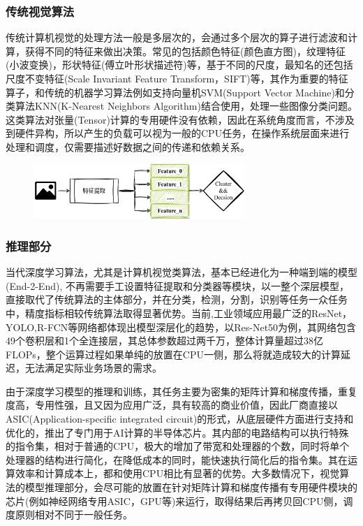 \documentclass[master]{shtthesis}
\begin{document}
\subsubsection{传统视觉算法}\label{传统视觉算法}
传统计算机视觉的处理方法一般是多层次的，会通过多个层次的算子进行滤波和计算，获得不同的特征来做出决策。常见的包括颜色特征(颜色直方图)，纹理特征(小波变换)，形状特征(傅立叶形状描述符)等，基于不同的尺度，最知名的还包括尺度不变特征(Scale Invariant Feature Transform，SIFT\cite{ng2003sift})等，其作为重要的特征算子，和传统的机器学习算法例如支持向量机SVM(Support Vector Machine)和分类算法KNN(K-Nearest Neighbors Algorithm)结合使用，处理一些图像分类问题。这类算法对张量(Tensor)计算的专用硬件没有依赖，因此在系统角度而言，不涉及到硬件异构，所以产生的负载可以视为一般的CPU任务，在操作系统层面来进行处理和调度，仅需要描述好数据之间的传递和依赖关系。

\begin{figure}[htbp]
	\centering
	\includegraphics[width=8cm]{img/trad_vis.png}
	\label{基于传统视觉算法的计算流程}
\end{figure}

\subsubsection{推理部分}\label{推理部分}
当代深度学习算法，尤其是计算机视觉类算法，基本已经进化为一种端到端的模型(End-2-End), 不再需要手工设置特征提取和分类器等模块，以一整个深层模型，直接取代了传统算法的主体部分，并在分类，检测，分割，识别等任务一众任务中，精度指标相较传统算法取得显著优势。当前,工业领域应用最广泛的ResNet，YOLO,R-FCN等网络都体现出模型深层化的趋势，以Res-Net50\cite{he2016deep}为例，其网络包含49个卷积层和1个全连接层，其总体参数超过两千万，整体计算量超过38亿FLOPs，整个运算过程如果单纯的放置在CPU一侧，那么将就造成较大的计算延迟，无法满足实际业务场景的需求。

由于深度学习模型的推理和训练，其任务主要为密集的矩阵计算和梯度传播，重复度高，专用性强，且又因为应用广泛，具有较高的商业价值，因此厂商直接以ASIC(Application-specific integrated circuit)的形式，从底层硬件方面进行支持和优化的，推出了专门用于AI计算的半导体芯片。其内部的电路结构可以执行特殊的指令集，相对于普通的CPU，极大的增加了带宽和处理器的个数，同时将单个处理器的结构进行简化，在降低成本的同时，能快速执行简化后的指令集。其在运算效率和计算成本上，都和使用CPU相比有显著的优势。大多数情况下，视觉算法的模型推理部分，会尽可能的放置在针对矩阵计算和梯度传播有专用硬件模块的芯片(例如神经网络专用ASIC，GPU等)来运行，取得结果后再拷贝回CPU侧，调度原则相对不同于一般任务。
\end{document}
